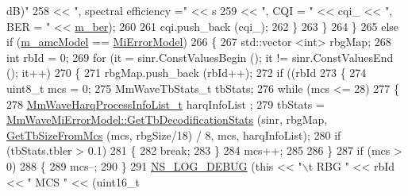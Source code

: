 \begin{DoxyCode}
{       dB)"}
258                                                                 << \textcolor{stringliteral}{", spectral efficiency ="} << s
259                                                                 << \textcolor{stringliteral}{", CQI = "} << cqi\_ << \textcolor{stringliteral}{", BER = "} << 
      \hyperlink{classns3_1_1MmWaveAmc_ac0e911c1ebab08ab7c52713ea5b35a15}{m\_ber});
260 
261                         cqi.push\_back (cqi\_);
262                         \}
263                 \}
264         \}
265         \textcolor{keywordflow}{else} \textcolor{keywordflow}{if} (\hyperlink{classns3_1_1MmWaveAmc_a4518d21ebad09825dd22466951c6935b}{m\_amcModel} == \hyperlink{classns3_1_1MmWaveAmc_a2805c1e6b48cb88e9cf86b062e079401ac8de076cfbfb1280afab7b9590e00151}{MiErrorModel})
266         \{
267                 std::vector <int> rbgMap;
268                 \textcolor{keywordtype}{int} rbId = 0;
269                 \textcolor{keywordflow}{for} (it = sinr.ConstValuesBegin (); it != sinr.ConstValuesEnd (); it++)
270                 \{
271                         rbgMap.push\_back (rbId++);
272                         \textcolor{keywordflow}{if} ((rbId %
273                         \{
274                                 uint8\_t mcs = 0;
275                                 MmWaveTbStats\_t tbStats;
276                                 \textcolor{keywordflow}{while} (mcs <= 28)
277                                 \{
278                                         \hyperlink{namespacens3_aca7c6bab455c2515f3e437749b5e904d}{MmWaveHarqProcessInfoList\_t} harqInfoList
      ;
279                                         tbStats = 
      \hyperlink{classns3_1_1MmWaveMiErrorModel_a82a14ebf85ae03a7815215c3c1a96cc7}{MmWaveMiErrorModel::GetTbDecodificationStats} (sinr, rbgMap, 
      \hyperlink{classns3_1_1MmWaveAmc_a46a70ae19f81f7b1f9307100caabc0e8}{GetTbSizeFromMcs} (mcs, rbgSize/18) / 8, mcs, harqInfoList);
280                                         \textcolor{keywordflow}{if} (tbStats.tbler > 0.1)
281                                         \{
282                                                 \textcolor{keywordflow}{break};
283                                         \}
284                                         mcs++;
285 
286                                 \}
287                                 \textcolor{keywordflow}{if} (mcs > 0)
288                                 \{
289                                         mcs--;
290                                 \}
291                                 \hyperlink{group__logging_ga413f1886406d49f59a6a0a89b77b4d0a}{NS\_LOG\_DEBUG} (\textcolor{keyword}{this} << \textcolor{stringliteral}{"\(\backslash\)t RBG "} << rbId << \textcolor{stringliteral}{" MCS "} << (uint16\_t

\end{DoxyCode}
